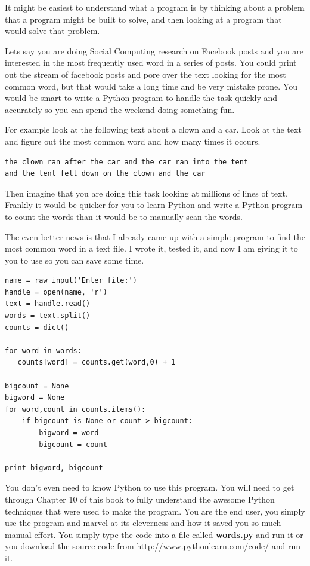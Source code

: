 It might be easiest to understand what a program is by thinking about a problem 
that a program might be built to solve, and then looking at a program
that would solve that problem.

Lets say you are doing Social Computing research on Facebook posts and 
you are interested in the most frequently used word in a series of posts.
You could print out the stream of facebook posts and pore over the text
looking for the most common word, but that would take a long time and be very 
mistake prone.  You would be smart to write a Python program to handle the
task quickly and accurately so you can spend the weekend doing something 
fun.

For example look at the following text about a clown and a car.  Look at the 
text and figure out the most common word and how many times it occurs.

\beforeverb
\begin{verbatim}
the clown ran after the car and the car ran into the tent 
and the tent fell down on the clown and the car 
\end{verbatim}
\afterverb
%
Then imagine that you are doing this task looking at millions of lines of 
text.  Frankly it would be quicker for you to learn Python and write a 
Python program to count the words than it would be to manually 
scan the words.

The even better news is that I already came up with a simple program to 
find the most common word in a text file.  I wrote it,
tested it, and now I am giving it to you to use so you can save some time.

\beforeverb
\begin{verbatim}
name = raw_input('Enter file:')
handle = open(name, 'r')
text = handle.read()
words = text.split()
counts = dict()

for word in words:
   counts[word] = counts.get(word,0) + 1

bigcount = None
bigword = None
for word,count in counts.items():
    if bigcount is None or count > bigcount:
        bigword = word
        bigcount = count

print bigword, bigcount
\end{verbatim}
\afterverb
%
You don't even need to know Python to use this program.  You will need to get through 
Chapter 10 of this book to fully understand the awesome Python techniques that were
used to make the program.  You are the end user, you simply use the program and marvel
at its cleverness and how it saved you so much manual effort.
You simply type the code 
into a file called {\bf words.py} and run it or you download the source 
code from \url{http://www.pythonlearn.com/code/} and run it.

